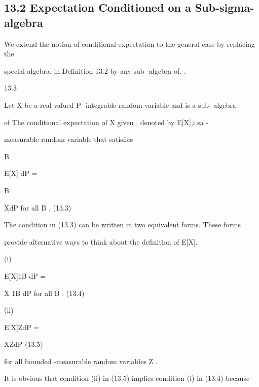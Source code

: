 \subsection*{13.2 Expectation Conditioned on a Sub-sigma-algebra}

We extend the notion of conditional expectation to the general case by replacing the

special\sigma-algebra. in Definition 13.2 by any sub-\sigma-algebra of. .

\begin{defbox}{13.3}
\end{defbox}

Let X be a real-valued P -integrable random variable and is a sub-\sigma-algebra

of The conditional expectation of X given , denoted by E[X\vert{}],i sa -

measurable random variable that satisfies

\int

B

E[X\vert{}] dP =

\int

B

XdP for all B \in{}. (13.3)

The condition in (13.3) can be written in two equivalent forms. These forms

provide alternative ways to think about the definition of E[X\vert{}].

(i)

\int

\Omega

E[X\vert{}]\cdot 1B dP =

\int

\Omega

X \cdot 1B dP for all B \in{}; (13.4)

(ii)

\int

\Omega

E[X\vert{}]\cdot ZdP =

\int

\Omega

X\cdot ZdP (13.5)

for all bounded -measurable random variables Z .

It is obvious that condition (ii) in (13.5) implies condition (i) in (13.4) because

